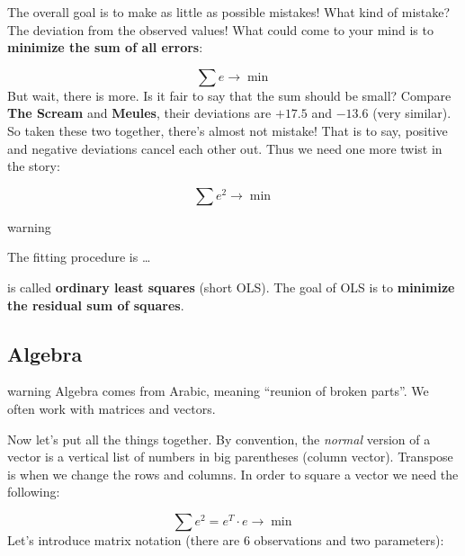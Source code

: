 \documentclass[
]{book}
\begin{document}
The overall goal is to make as little as possible mistakes! What kind of mistake? The deviation from the observed values! What could come to your mind is to \textbf{minimize the sum of all errors}:

\[\sum e \rightarrow \min\]
But wait, there is more. Is it fair to say that the sum should be small? Compare \textbf{The Scream} and \textbf{Meules}, their deviations are \(+17.5\) and \(-13.6\) (very similar). So taken these two together, there's almost not mistake! That is to say, positive and negative deviations cancel each other out. Thus we need one more twist in the story:

\[\sum e^2 \rightarrow \min\]

\begin{infobox}warning

The fitting procedure is \ldots{}

is called \textbf{ordinary least squares} (short OLS). The goal of OLS is to \textbf{minimize the residual sum of squares}.

\end{infobox}

\hypertarget{algebra}{%
\subsection{Algebra}\label{algebra}}

\begin{infobox}warning
Algebra comes from Arabic, meaning ``reunion of broken parts''. We often work with matrices and vectors.

\end{infobox}

Now let's put all the things together. By convention, the \emph{normal} version of a vector is a vertical list of numbers in big parentheses (column vector). Transpose is when we change the rows and columns. In order to square a vector we need the following:

\[\sum e^2 = e^T \cdot e \rightarrow \min\]
Let's introduce matrix notation (there are 6 observations and two parameters):
\end{document}
